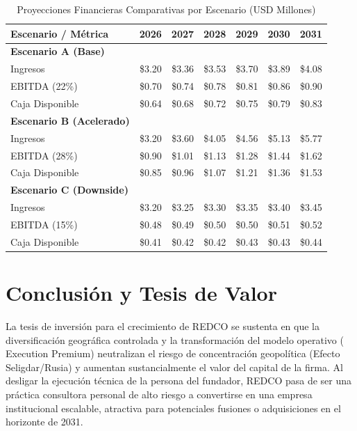 \begin{table}[htbp]
\centering
\caption{Proyecciones Financieras Comparativas por Escenario (USD Millones)}
\begin{tabular}{@{}lrrrrrr@{}}
\toprule
\textbf{Escenario / Métrica} & \textbf{2026} & \textbf{2027} & \textbf{2028} & \textbf{2029} & \textbf{2030} & \textbf{2031} \\
\midrule
\textbf{Escenario A (Base)} & & & & & & \\
Ingresos & \$3.20 & \$3.36 & \$3.53 & \$3.70 & \$3.89 & \$4.08 \\
\rowcolor{tablealt} EBITDA (22\%) & \$0.70 & \$0.74 & \$0.78 & \$0.81 & \$0.86 & \$0.90 \\
Caja Disponible & \$0.64 & \$0.68 & \$0.72 & \$0.75 & \$0.79 & \$0.83 \\
\midrule
\textbf{Escenario B (Acelerado)} & & & & & & \\
Ingresos & \$3.20 & \$3.60 & \$4.05 & \$4.56 & \$5.13 & \$5.77 \\
\rowcolor{tablealt} EBITDA (28\%) & \$0.90 & \$1.01 & \$1.13 & \$1.28 & \$1.44 & \$1.62 \\
Caja Disponible & \$0.85 & \$0.96 & \$1.07 & \$1.21 & \$1.36 & \$1.53 \\
\midrule
\textbf{Escenario C (Downside)} & & & & & & \\
Ingresos & \$3.20 & \$3.25 & \$3.30 & \$3.35 & \$3.40 & \$3.45 \\
\rowcolor{tablealt} EBITDA (15\%) & \$0.48 & \$0.49 & \$0.50 & \$0.50 & \$0.51 & \$0.52 \\
Caja Disponible & \$0.41 & \$0.42 & \$0.42 & \$0.43 & \$0.43 & \$0.44 \\
\bottomrule
\end{tabular}
\label{tab:financial_projections}
\end{table}

\section{Conclusión y Tesis de Valor}

La tesis de inversión para el crecimiento de REDCO se sustenta en que la diversificación geográfica controlada y la transformación del modelo operativo ( Execution Premium) neutralizan el riesgo de concentración geopolítica (Efecto Seligdar/Rusia) y aumentan sustancialmente el valor del capital de la firma. Al desligar la ejecución técnica de la persona del fundador, REDCO pasa de ser una práctica consultora personal de alto riesgo a convertirse en una empresa institucional escalable, atractiva para potenciales fusiones o adquisiciones en el horizonte de 2031.

